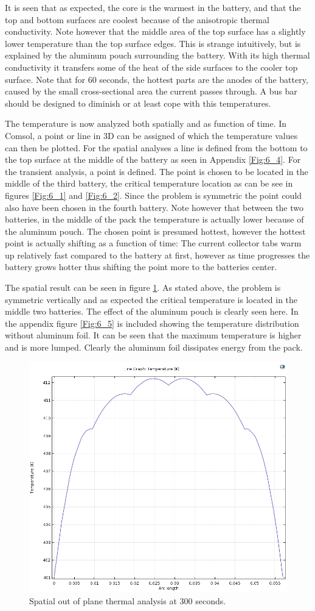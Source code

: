 It is seen that as expected, the core is the warmest in the battery, and that the top and bottom surfaces are coolest because of the anisotropic thermal conductivity. Note however that the middle area of the top surface has a slightly lower temperature than the top surface edges. This is strange intuitively, but is explained by the aluminum pouch surrounding the battery. With its high thermal conductivity it transfers some of the heat of the side surfaces to the cooler top surface. Note that for 60 seconds, the hottest parts are the anodes of the battery, caused by the small cross-sectional area the current passes through. A bus bar should be designed to diminish or at least cope with this temperatures.

The temperature is now analyzed both spatially and as function of time. In Comsol, a point or line in 3D can be assigned of which the temperature values can then be plotted. For the spatial analyses a line is defined from the bottom to the top surface at the middle of the battery as seen in Appendix \ref{Fig:6_4}. For the transient analysis, a point is defined. The point is chosen to be located in the middle of the third battery, the critical temperature location as can be see in figures \ref{Fig:6_1} and \ref{Fig:6_2}. Since the problem is symmetric the point could also have been chosen in the fourth battery. Note however that between the two batteries, in the middle of the pack the temperature is actually lower because of the aluminum pouch. The chosen point is presumed hottest, however the hottest point is actually shifting as a function of time: The current collector tabs warm up relatively fast compared to the battery at first, however as time progresses the battery grows hotter thus shifting the point more to the batteries center.

The spatial result can be seen in figure \ref{Fig:Out_Of_Plane_300s}. As stated above, the problem is symmetric vertically and as expected the critical temperature is located in the middle two batteries. The effect of the aluminum pouch is clearly seen here. In the appendix figure \ref{Fig:6_5} is included showing the temperature distribution without aluminum foil. It can be seen that the maximum temperature is higher and is more lumped. Clearly the aluminum foil dissipates energy from the pack.

\begin{figure} [H]
	\centering
	\includegraphics[width=0.5\linewidth]{Figures/300s_10h_180A_2mOhm_OutOfPlaneLast.png}
	\caption{Spatial out of plane thermal analysis at 300 seconds.}
   \label{Fig:Out_Of_Plane_300s}
\end{figure}

